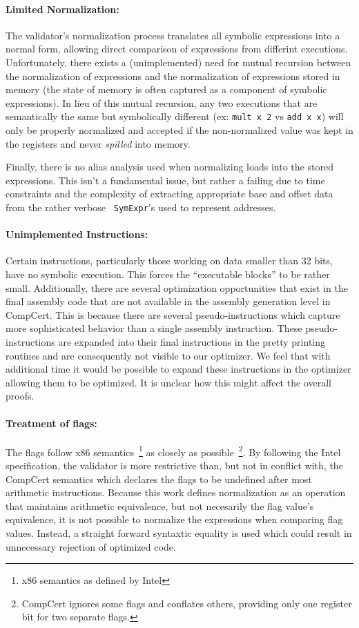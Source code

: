 \documentclass{article}
\begin{document}
\paragraph{Limited Normalization: }The validator's normalization
process translates all symbolic expressions into a normal form,
allowing direct comparison of expressions from differint executions.
Unfortunately, there exists a (unimplemented) need for mutual
recursion between the normalization of expressions and the
normalization of expressions stored in memory (the state of memory is
often captured as a component of symbolic expressions).  In lieu of
this mutual recursion, any two executions that are semantically the
same but symbolically different (ex: {\tt mult x 2} vs {\tt add x x})
will only be properly normalized and accepted if the non-normalized
value was kept in the registers and never {\it spilled} into memory.

Finally, there is no alias analysis used when normalizing loads into
the stored expressions.  This isn't a fundamental issue, but rather a
failing due to time constraints and the complexity of extracting
appropriate base and offset data from the rather verbose {\tt
  SymExpr}'s used to represent addresses.

\paragraph{Unimplemented Instructions: }
Certain instructions, particularly those working on data smaller than
32 bits, have no symbolic execution. This forces the ``executable
blocks'' to be rather small. Additionally, there are several
optimization opportunities that exist in the final assembly code that
are not available in the assembly generation level in CompCert. This
is because there are several pseudo-instructions which capture more
sophisticated behavior than a single assembly instruction. These
pseudo-instructions are expanded into their final instructions in the
pretty printing routines and are consequently not visible to our
optimizer. We feel that with additional time it would be possible to
expand these instructions in the optimizer allowing them to be
optimized. It is unclear how this might affect the overall proofs.

\paragraph{Treatment of flags: } 
The flags follow x86 semantics~\footnote{x86 semantics as defined by
  Intel} as closely as possible~\footnote{CompCert ignores some flags
  and conflates others, providing only one register bit for two
  separate flags.}.  By following the Intel specification, the
validator is more restrictive than, but not in conflict with, the
CompCert semantics which declares the flags to be undefined after most
arithmetic instructions.  Because this work defines normalization as
an operation that maintains arithmetic equivalence, but not necesarily
the flag value's equivalence, it is not possible to normalize the
expressions when comparing flag values.  Instead, a straight forward
syntaxtic equality is used which could result in unnecessary rejection
of optimized code.
\end{document}
